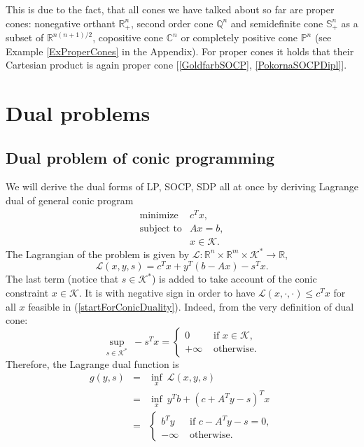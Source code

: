 \documentclass[12pt]{book}
\theoremstyle{definition}
\begin{document}
This is due to the fact, that all cones we have talked about so far are proper cones: nonegative orthant $\mathbb{R}^n_+$, second order cone $\mathbb{Q}^n$ and semidefinite cone $\mathbb{S}^n_+$ as a subset of $ \mathbb{R}^{n(n+1)/2}$, copositive cone $\mathbb{C}^n$ or completely positive cone $\mathbb{P}^n$ (see Example \ref{ExProperCones} in the Appendix). 
For proper cones it holds that their Cartesian product is again proper cone [\ref{GoldfarbSOCP}, \ref{PokornaSOCPDipl}].  

\section{Dual problems}


\subsection{Dual problem of conic programming}

We will derive the dual forms of LP, SOCP, SDP all at once by deriving Lagrange dual of general conic program
\begin{equation}
\label{startForConicDuality}
\begin{array}{ll}
\mbox{minimize} & c^Tx,\\
\mbox{subject to}& Ax = b,\\
& x \in \mathcal{K}.
\end{array} 
\end{equation}
The Lagrangian of the problem is given by $\mathcal{L}:\mathbb{R}^n\times\mathbb{R}^m\times\mathcal{K}^*\rightarrow \mathbb{R},$
\begin{equation}
\mathcal{L}(x,y,s) = c^Tx + y^T(b-Ax) - s^Tx. %
\end{equation}
The last term (notice that $s\in\mathcal{K}^*$) is added to take account of the conic constraint $x\in \mathcal{K}$.  
It is with negative sign in order to have $\mathcal{L}(x,\cdot,\cdot)\leq c^Tx$ for all $x$ feasible in (\ref{startForConicDuality}). 
Indeed, from the very definition of dual cone:
\begin{equation}
\sup_{s\in \mathcal{K}^*} \ -s^Tx = 
\left\lbrace \begin{array}{ll} 
0 & \mbox{ if } x\in\mathcal{K},\\ 
+\infty & \mbox{ otherwise.}
\end{array}\right. 
\end{equation}
Therefore, the Lagrange dual function is 
\begin{eqnarray}
g(y,s) &=& \inf_x \ \mathcal{L}(x,y,s) \\
&=& \inf_x \ y^Tb + (c+A^Ty -s)^Tx \\
&=& \left\lbrace \begin{array}{ll} 
b^Ty & \mbox{ if } c-A^Ty - s = 0,\\ 
-\infty & \mbox{ otherwise.}
\end{array}\right. 
\end{eqnarray}
\end{document}
